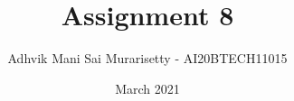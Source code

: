 \documentclass[journal,12pt,twocolumn]{IEEEtran}
\date{March 2021}
\DeclareMathOperator*{\Res}{Res}
\begin{document}
\newcommand{\BEQA}{\begin{eqnarray}}
\newcommand{\EEQA}{\end{eqnarray}}
\newcommand{\define}{\stackrel{\triangle}{=}}

\raggedbottom
\setlength{\parindent}{0pt}
\providecommand{\mbf}{\mathbf}
\providecommand{\pr}[1]{\ensuremath{\Pr\left(#1\right)}}
\providecommand{\qfunc}[1]{\ensuremath{Q\left(#1\right)}}
\providecommand{\fn}[1]{\ensuremath{f\left({#1}\right)}}
\providecommand{\e}[1]{\ensuremath{E\left(#1\right)}}
\providecommand{\sbrak}[1]{\ensuremath{{}\left[#1\right]}}
\providecommand{\lsbrak}[1]{\ensuremath{{}\left[#1\right.}}
\providecommand{\rsbrak}[1]{\ensuremath{{}\left.#1\right]}}
\providecommand{\brak}[1]{\ensuremath{\left(#1\right)}}
\providecommand{\lbrak}[1]{\ensuremath{\left(#1\right.}}
\providecommand{\rbrak}[1]{\ensuremath{\left.#1\right)}}
\providecommand{\cbrak}[1]{\ensuremath{\left\{#1\right\}}}
\providecommand{\lcbrak}[1]{\ensuremath{\left\{#1\right.}}
\providecommand{\rcbrak}[1]{\ensuremath{\left.#1\right\}}}
\theoremstyle{remark}
\newtheorem{rem}{Remark}
\newcommand{\sgn}{\mathop{\mathrm{sgn}}}
\newcommand{\comb}[2]{{}^{#1}\mathrm{C}_{#2}}
\providecommand{\abs}[1]{\vert#1\vert}
\providecommand{\res}[1]{\Res\displaylimits_{#1}} 
\providecommand{\norm}[1]{\lVert#1\rVert}
\providecommand{\mtx}[1]{\mathbf{#1}}
\providecommand{\mean}[1]{E\sbrak{ #1 }}
\providecommand{\fourier}{\overset{\mathcal{F}}{ \rightleftharpoons}}
\providecommand{\system}{\overset{\mathcal{H}}{ \longleftrightarrow}}
\newcommand{\solution}{\noindent \textbf{Solution: }}
\newcommand{\cosec}{\,\text{cosec}\,}
\providecommand{\dec}[2]{\ensuremath{\overset{#1}{\underset{#2}{\gtrless}}}}
\newcommand{\myvec}[1]{\ensuremath{\begin{pmatrix}#1\end{pmatrix}}}
\newcommand{\mydet}[1]{\ensuremath{\begin{vmatrix}#1\end{vmatrix}}}
\makeatletter
\vspace{3cm}
\title{Assignment 8}
\author{Adhvik Mani Sai Murarisetty - AI20BTECH11015}
\maketitle
\newpage
\bigskip
\renewcommand{\thetable}{\theenumi}
\end{document}
